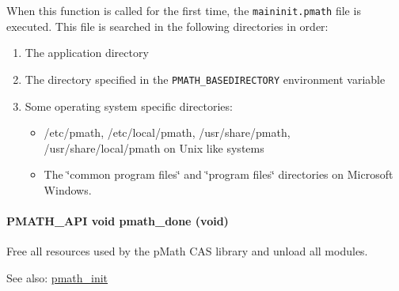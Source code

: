 When this function is called for the first time, the {\tt maininit.pmath} file is executed. This file is searched in the following directories in order:\begin{enumerate}
\item The application directory\item The directory specified in the {\tt PMATH\_\-BASEDIRECTORY} environment variable\item Some operating system specific directories:\begin{itemize}
\item /etc/pmath, /etc/local/pmath, /usr/share/pmath, /usr/share/local/pmath on Unix like systems\item The \char`\"{}common program files\char`\"{} and \char`\"{}program files\char`\"{} directories on Microsoft Windows. \end{itemize}
\end{enumerate}
\hypertarget{group__frontend_g012705e1fd248a7cebf738bae6375dd9}{
\paragraph[{pmath\_\-done}]{\setlength{\rightskip}{0pt plus 5cm}PMATH\_\-API void pmath\_\-done (void)}\hfill}
\label{group__frontend_g012705e1fd248a7cebf738bae6375dd9}


Free all resources used by the pMath CAS library and unload all modules. 

\begin{Desc}
\item[See also:]\hyperlink{group__frontend_gfb9f2c789bee5295c6794d16c0164943}{pmath\_\-init} \end{Desc}

